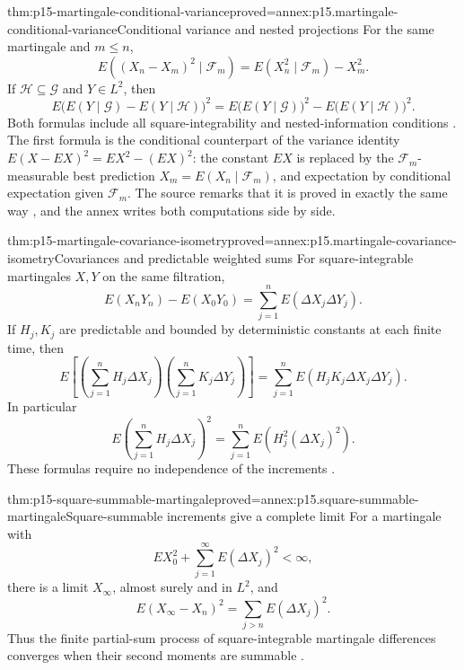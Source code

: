 \begin{hbtheorem}{thm:p15-martingale-conditional-variance}{proved=annex:p15.martingale-conditional-variance}{Conditional variance and nested projections}
For the same martingale and \(m\leq n\),
\[
             E((X_n-X_m)^2\mid\mathcal F_m)
                         =E(X_n^2\mid\mathcal F_m)-X_m^2.
\]
If \(\mathcal H\subseteq\mathcal G\) and \(Y\in L^2\), then
\[
 E\bigl(E(Y\mid\mathcal G)-E(Y\mid\mathcal H)\bigr)^2
   =E\bigl(E(Y\mid\mathcal G)\bigr)^2
                      -E\bigl(E(Y\mid\mathcal H)\bigr)^2.
\]
Both formulas include all square-integrability and nested-information
conditions \cite[thm.~4.4.8, ex.~4.4.5]{DurrettPTEAuthor2019}.
The first formula is the conditional counterpart of the variance identity
\(E(X-EX)^2=EX^2-(EX)^2\): the constant \(EX\) is replaced by the
\(\mathcal F_m\)-measurable best prediction \(X_m=E(X_n\mid\mathcal F_m)\),
and expectation by conditional expectation given \(\mathcal F_m\).
The source remarks that it is proved in exactly the same way
\cite[remark after thm.~4.4.8, p.~237]{DurrettPTEAuthor2019}, and the annex
writes both computations side by side.
\end{hbtheorem}

\begin{hbtheorem}{thm:p15-martingale-covariance-isometry}{proved=annex:p15.martingale-covariance-isometry}{Covariances and predictable weighted sums}
For square-integrable martingales \(X,Y\) on the same filtration,
\[
        E(X_nY_n)-E(X_0Y_0)
                        =\sum_{j=1}^nE(\Delta X_j\Delta Y_j).
\]
If \(H_j,K_j\) are predictable and bounded by deterministic constants
at each finite time, then
\[
 E\left[\left(\sum_{j=1}^nH_j\Delta X_j\right)
         \left(\sum_{j=1}^nK_j\Delta Y_j\right)\right]
                    =\sum_{j=1}^nE(H_jK_j\Delta X_j\Delta Y_j).
\]
In particular
\[
                 E\left(\sum_{j=1}^nH_j\Delta X_j\right)^2
                                =\sum_{j=1}^nE(H_j^2(\Delta X_j)^2).
\]
These formulas require no independence of the increments
\cite[ex.~4.4.9]{DurrettPTEAuthor2019}.
\end{hbtheorem}

\begin{hbtheorem}{thm:p15-square-summable-martingale}{proved=annex:p15.square-summable-martingale}{Square-summable increments give a complete limit}
For a martingale with
\[
                       EX_0^2+\sum_{j=1}^\infty E(\Delta X_j)^2<\infty,
\]
there is a limit \(X_\infty\), almost surely and in \(L^2\), and
\[
                  E(X_\infty-X_n)^2
                                =\sum_{j>n}E(\Delta X_j)^2.
\]
Thus the finite partial-sum process of square-integrable martingale
differences converges when their second moments are summable
\cite[ex.~4.4.10]{DurrettPTEAuthor2019}.
\end{hbtheorem}

